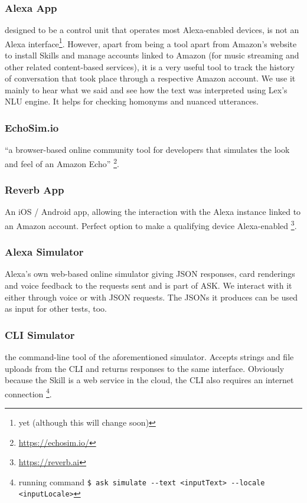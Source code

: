 	
\subsubsection*{Alexa App}
	designed to be a control unit that operates most Alexa-enabled devices, is not an Alexa interface\footnote{yet (although this will change soon)}. However, apart from being a tool apart from Amazon's website to install Skills and manage accounts linked to Amazon (for music streaming and other related content-based services), it is a very useful tool to track the history of conversation that took place through a respective Amazon account. We use it mainly to hear what we said and see how the text was interpreted using Lex's NLU engine. It helps for checking homonyms and nuanced utterances.
	
	
	\subsubsection*{EchoSim.io}
	 ``a browser-based online community tool for developers that simulates the look and feel of an Amazon Echo'' \footnote{\url{https://echosim.io/}}. %
	
	\subsubsection*{Reverb App}
	An iOS / Android app, allowing the interaction with the Alexa instance linked to an Amazon account. Perfect option to make a qualifying device Alexa-enabled \footnote{\url{https://reverb.ai}}. 
	
\subsubsection*{Alexa Simulator}
	Alexa's own web-based online simulator giving JSON responses, card renderings and voice feedback to the requests sent and is part of ASK. We interact with it either through voice or with JSON requests. The JSONs it produces can be used as input for other tests, too. 
	
	\subsubsection*{CLI Simulator}
	the command-line tool of the aforementioned simulator. Accepts strings and file uploads from the CLI and returns responses to the same interface. Obviously because the Skill is a web service in the cloud, the CLI also requires an internet connection \footnote{running command \lstinline|$ ask simulate --text <inputText> --locale <inputLocale>|}.
	

